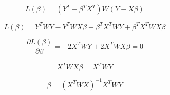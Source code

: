 \documentclass{article}
\begin{document}
\begin{equation}
    L(\beta) = (Y^T - {\beta^T}{X^T})W(Y - X\beta)
\end{equation}

\begin{equation}
    L(\beta) = Y^{T}WY - Y^{T}WX\beta - {\beta^T}{X^T}WY + {\beta^T}{X^T}WX\beta
\end{equation}

\begin{equation}
    \frac{\partial L(\beta)}{\partial \beta} = -2X^{T}WY + 2X^{T}WX\beta = 0
\end{equation}

\begin{equation}
    X^{T}WX\beta = X^{T}WY
\end{equation}

\begin{equation}
    \beta = {(X^{T}WX)}^{-1}X^{T}WY
\end{equation}
\end{document}

